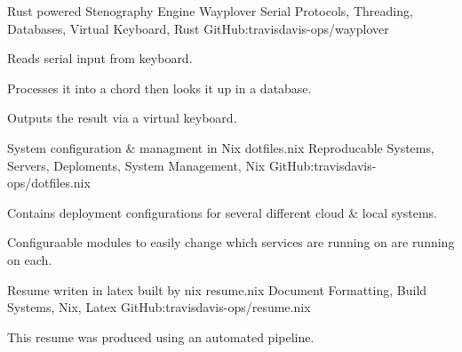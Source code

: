 

\begin{cventries}

  \cventry
    { Rust powered Stenography Engine}
    { Wayplover } %
    { Serial Protocols, Threading, Databases, Virtual Keyboard, Rust} %
    { GitHub:travisdavis-ops/wayplover }
    {
        \begin{cvitems}
            \item { Reads serial input from keyboard. }
            \item { Processes it into a chord then looks it up in a database. }
            \item { Outputs the result via a virtual keyboard. }
        \end{cvitems}
    }
  \cventry
    { System configuration \& managment in Nix }
    { dotfiles.nix } %
    { Reproducable Systems, Servers, Deploments, System Management, Nix} %
    { GitHub:travisdavis-ops/dotfiles.nix}
    {
        \begin{cvitems}
            \item { Contains deployment configurations for several different cloud \& local systems. }
            \item { Configuraable modules to easily change which services are running on are running on each. }
        \end{cvitems}
    }
  \cventry
    { Resume writen in latex built by nix}
    { resume.nix } %
    { Document Formatting, Build Systems, Nix, Latex} %
    { GitHub:travisdavis-ops/resume.nix}
    {
        \begin{cvitems}
            \item { This resume was produced using an automated pipeline.}
        \end{cvitems}
    }
\end{cventries}
